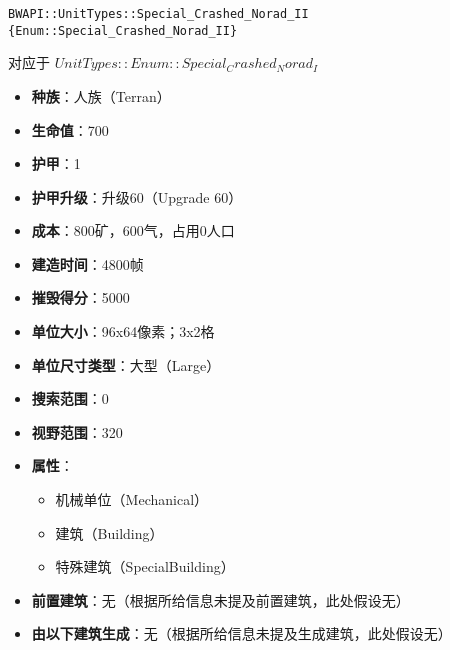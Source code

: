 \begin{tcolorbox}[colback=white, colframe=black!60!white, title=Special\_Crashed\_Norad\_II(), arc=0mm]
    \begin{verbatim}
BWAPI::UnitTypes::Special_Crashed_Norad_II {Enum::Special_Crashed_Norad_II}
    \end{verbatim}
    对应于  $ UnitTypes::Enum::Special_Crashed_Norad_I $ 
    \begin{itemize}
        \item \textbf{种族}：人族（Terran）
        \item \textbf{生命值}：700
        \item \textbf{护甲}：1
        \item \textbf{护甲升级}：升级60（Upgrade 60）
        \item \textbf{成本}：800矿，600气，占用0人口
        \item \textbf{建造时间}：4800帧
        \item \textbf{摧毁得分}：5000
        \item \textbf{单位大小}：96x64像素；3x2格
        \item \textbf{单位尺寸类型}：大型（Large）
        \item \textbf{搜索范围}：0
        \item \textbf{视野范围}：320
        \item \textbf{属性}：
            \begin{itemize}
                \item 机械单位（Mechanical）
                \item 建筑（Building）
                \item 特殊建筑（SpecialBuilding）
            \end{itemize}
        \item \textbf{前置建筑}：无（根据所给信息未提及前置建筑，此处假设无）
        \item \textbf{由以下建筑生成}：无（根据所给信息未提及生成建筑，此处假设无）
    \end{itemize} 
\end{tcolorbox}

